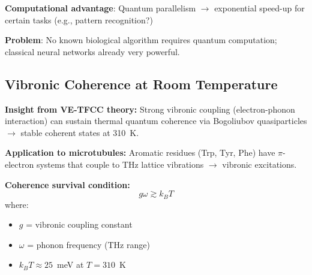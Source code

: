\begin{center}
\end{center}

\textbf{Computational advantage}: Quantum parallelism $\rightarrow$ exponential speed-up for certain tasks (e.g., pattern recognition?)

\textbf{Problem}: No known biological algorithm requires quantum computation; classical neural networks already very powerful.

\subsection{Vibronic Coherence at Room Temperature}
\label{subsec:vibronic-coherence}

\textbf{Insight from VE-TFCC theory:} Strong vibronic coupling (electron-phonon interaction) can sustain thermal quantum coherence via Bogoliubov quasiparticles $\rightarrow$ stable coherent states at 310~K.

\textbf{Application to microtubules:} Aromatic residues (Trp, Tyr, Phe) have $\pi$-electron systems that couple to THz lattice vibrations $\rightarrow$ vibronic excitations.

\textbf{Coherence survival condition:}
\begin{equation}
g \omega \gtrsim k_B T
\end{equation}
where:
\begin{itemize}
\item $g$ = vibronic coupling constant
\item $\omega$ = phonon frequency (THz range)
\item $k_B T \approx 25$~meV at $T = 310$~K
\end{itemize}

